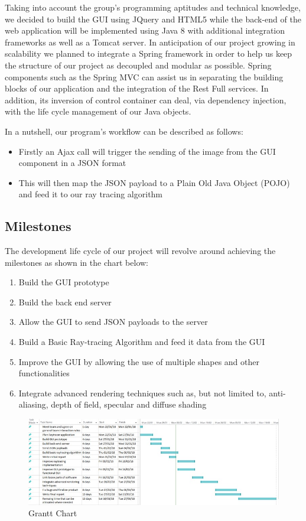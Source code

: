 \documentclass[11pt,a4paper]{article}
\begin{document}
Taking into account the group's programming aptitudes and technical knowledge, we decided to build the GUI using JQuery and HTML5 while the back-end of the web application will be implemented using Java 8 with additional integration frameworks as well as a Tomcat server. In anticipation of our project growing in scalability we planned to integrate a Spring framework in order to help us keep the structure of our project as decoupled and modular as possible. Spring components such as the Spring MVC can assist us in separating the building blocks of our application and the integration of the Rest Full services. In addition, its inversion of control container can deal, via dependency injection, with the life cycle management of our Java objects.

In a nutshell, our program's workflow can be described as follows:
\begin{itemize}[nosep, wide=20pt, leftmargin=*, after=\strut]
    \item Firstly an Ajax call will trigger the sending of the image from the GUI component in a JSON format
    \item This will then map the JSON payload to a Plain Old Java Object (POJO) and feed it to our ray tracing algorithm
\end{itemize}

\subsection{Milestones}

The development life cycle of our project will revolve around achieving the milestones as shown in the chart below:
\begin{enumerate}[nosep, wide=20pt, leftmargin=*, after=\strut]
    \item Build the GUI prototype 
    \item Build the back end server
    \item Allow the GUI to send JSON payloads to the server
    \item Build a Basic Ray-tracing Algorithm and feed it data from the GUI
    \item Improve the GUI by allowing the use of multiple shapes and other functionalities
    \item Integrate advanced rendering techniques such as, but not limited to, anti-aliasing, depth of field, specular and diffuse shading
\end{enumerate}


\begin{figure}[h]
\centering
\includegraphics[scale = 0.4]{ganttchart.jpeg}
\caption{Grantt Chart}
\end{figure}
\end{document}
